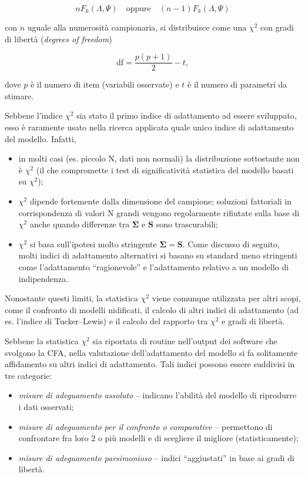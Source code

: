 \documentclass[
  11pt,
]{krantz}
\providecommand{\tightlist}{%
  \setlength{\itemsep}{0pt}\setlength{\parskip}{0pt}}
\theoremstyle{definition}
\theoremstyle{definition}
\theoremstyle{definition}
\theoremstyle{definition}
\theoremstyle{remark}
\begin{document}
\[
n F_{k}(\Lambda, \Psi) \quad \text{oppure}\quad (n-1) F_{k}(\Lambda, \Psi)
\]

con \(n\) uguale alla numerosità campionaria, si distribuisce come una \(\chi^2\) con gradi di libertà (\emph{degrees of freedom})

\begin{equation}
\mbox{df} = \frac{p (p+1)}{2}-t,
\end{equation}

dove \(p\) è il numero di item (variabili osservate) e \(t\) è il numero di parametri da stimare.

Sebbene l'indice \(\chi^2\) sia stato il primo indice di adattamento ad essere sviluppato, esso è raramente usato nella ricerca applicata quale unico indice di adattamento del modello. Infatti,

\begin{itemize}
\tightlist
\item
  in molti casi (es. piccolo N, dati non normali) la distribuzione sottostante non è \(\chi^2\) (il che compromette i test di significatività statistica del modello basati su \(\chi^2\));
\item
  \(\chi^2\) dipende fortemente dalla dimensione del campione; soluzioni fattoriali in corrispondenza di valori N grandi vengono regolarmente rifiutate sulla base di \(\chi^2\) anche quando differenze tra \(\boldsymbol{\Sigma}\) e \(\boldsymbol{S}\) sono trascurabili;
\item
  \(\chi^2\) si basa sull'ipotesi molto stringente \(\boldsymbol{\Sigma} = \boldsymbol{S}\). Come discusso di seguito, molti indici di adattamento alternativi si basano su standard meno stringenti come l'adattamento ``ragionevole'' e l'adattamento relativo a un modello di indipendenza.
\end{itemize}

Nonostante questi limiti, la statistica \(\chi^2\) viene comunque utilizzata per altri scopi, come il confronto di modelli nidificati, il calcolo di altri indici di adattamento (ad es. l'indice di Tucker--Lewis) e il calcolo del rapporto tra \(\chi^2\) e gradi di libertà.

Sebbene la statistica \(\chi^2\) sia riportata di routine nell'output dei software che svolgono la CFA, nella valutazione dell'adattamento del modello si fa solitamente affidamento su altri indici di adattamento. Tali indici possono essere suddivisi in tre categorie:

\begin{itemize}
\tightlist
\item
  \emph{misure di adeguamento assoluto} -- indicano l'abilità del modello di riprodurre i dati osservati;
\item
  \emph{misure di adeguamento per il confronto o comparative} -- permettono di confrontare fra loro 2 o più modelli e di scegliere il migliore (statisticamente);
\item
  \emph{misure di adeguamento parsimonioso} -- indici ``aggiustati'' in base ai gradi di libertà.
\end{itemize}
\end{document}
